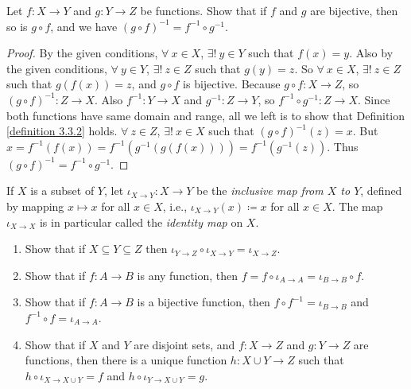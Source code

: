 \begin{exercise}\label{exercise 3.3.7}
Let \(f : X \to Y\) and \(g : Y \to Z\) be functions.
Show that if \(f\) and \(g\) are bijective, then so is \(g \circ f\), and we have \((g \circ f)^{-1} = f^{-1} \circ g^{-1}\).
\end{exercise}

\begin{proof}
By the given conditions, \(\forall\ x \in X\), \(\exists!\ y \in Y\) such that \(f(x) = y\).
Also by the given conditions, \(\forall\ y \in Y\), \(\exists!\ z \in Z\) such that \(g(y) = z\).
So \(\forall\ x \in X\), \(\exists!\ z \in Z\) such that \(g(f(x)) = z\), and \(g \circ f\) is bijective.
Because \(g \circ f : X \to Z\), so \((g \circ f)^{-1} : Z \to X\).
Also \(f^{-1} : Y \to X\) and \(g^{-1} : Z \to Y\), so \(f^{-1} \circ g^{-1} : Z \to X\).
Since both functions have same domain and range, all we left is to show that Definition \ref{definition 3.3.2} holds.
\(\forall\ z \in Z\), \(\exists!\ x \in X\) such that \((g \circ f)^{-1}(z) = x\).
But \(x = f^{-1}(f(x)) = f^{-1}(g^{-1}(g(f(x)))) = f^{-1}(g^{-1}(z))\).
Thus \((g \circ f)^{-1} = f^{-1} \circ g^{-1}\).
\end{proof}

\begin{exercise}\label{exercise 3.3.8}
If \(X\) is a subset of \(Y\), let \(\iota_{X \to Y} : X \to Y\) be the \emph{inclusive map from \(X\) to \(Y\)}, defined by mapping \(x \mapsto x\) for all \(x \in X\), i.e., \(\iota_{X \to Y}(x) \coloneqq x\) for all \(x \in X\).
The map \(\iota_{X \to X}\) is in particular called the \emph{identity map} on \(X\).

    \begin{enumerate}
        \item Show that if \(X \subseteq Y \subseteq Z\) then \(\iota_{Y \to Z} \circ \iota_{X \to Y} = \iota_{X \to Z}\).
        \item Show that if \(f : A \to B\) is any function, then \(f = f \circ \iota_{A \to A} = \iota_{B \to B} \circ f\).
        \item Show that if \(f : A \to B\) is a bijective function, then \(f \circ f^{-1} = \iota_{B \to B}\) and \(f^{-1} \circ f = \iota_{A \to A}\).
        \item Show that if \(X\) and \(Y\) are disjoint sets, and \(f : X \to Z\) and \(g : Y \to Z\) are functions, then there is a unique function \(h : X \cup Y \to Z\) such that \(h \circ \iota_{X \to X \cup Y} = f\) and \(h \circ \iota_{Y \to X \cup Y} = g\).
    \end{enumerate}
\end{exercise}

